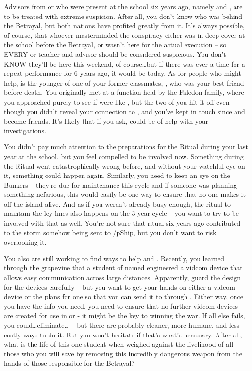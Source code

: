 \documentclass[char]{GL2020}
\begin{document}
Advisors from \pFarm{} or \pTech{} who were present at the school six years ago, namely \cDiplomat{} and \cEvil{}, are to be treated with extreme suspicion. After all, you don’t know who was behind the Betrayal, but both nations have profited greatly from it. It’s always possible, of course, that whoever masterminded the conspiracy either was in deep cover at the school before the Betrayal, or wasn’t here for the actual execution -- so EVERY \pFarm{} or \pTech{} teacher and advisor should be considered suspicious. You don’t KNOW they’ll be here this weekend, of course\ldots but if there was ever a time for a repeat performance for 6 years ago, it would be today. As for people who might help, \cHeir{} is the younger \cHeir{\sibling} of one of your former classmates, \cHeirSibling{}, who was your best friend before \cHeirSibling{\their} death. You originally met \cHeir{} at a function held by the Faledon family, where you approached \cHeir{\them} purely to see if \cHeir{\they} were like \cHeir{\their} \cHeir{\sibling}, but the two of you hit it off even though you didn’t reveal your connection to \cHeirSibling{}, and you’ve kept in touch since and become friends. It’s likely that if you ask, \cHeir{\they} could be of help with your investigations. 

You didn’t pay much attention to the preparations for the Ritual during your last year at the school, but you feel compelled to be involved now. Something during the Ritual went catastrophically wrong before, and without your watchful eye on it, something could happen again.  Similarly, you need to keep an eye on the Bunkers -- they’re due for maintenance this cycle and if someone was planning something nefarious, this would easily be one way to ensure that no one makes it off the island alive. And as if you weren’t already busy enough, the ritual to maintain the ley lines also happens on the 3 year cycle -- you want to try to be involved with that as well. You're not sure that ritual six years ago contributed to the storm somehow being sent to /pShip{}, but you don't want to risk overlooking it.

You also are still working to find ways to help \cSavFlet{}{} and \pShip{}.  Recently, you learned through the grapevine that a student of \pTech{} named \cTechStar{} engineered a vidcom device that allows easy communication across large distances. Apparently, \cTechStar{\They} guard\cTechStar{\plural} the design for the devices carefully -- but you want to get your hands on either a vidcom device or the plans for one so that you can send it to \pShip{} through \cSavFlet{}. Either way, once you have the info you need, you need to ensure that no further vidcom devices are created for use in \pTech{} or \pFarm{} - it might be the key to \pShip{} winning the war. If all else fails, you could\ldots eliminate\ldots \cTechStar{} -- but there are probably cleaner, more humane, and less costly ways to do it. But you won’t hesitate if that’s what’s necessary. After all, what is the life of this one student when weighed against the livelihood of all those who you will save by removing this incredibly dangerous weapon from the hands of those responsible for the Betrayal?
\end{document}
